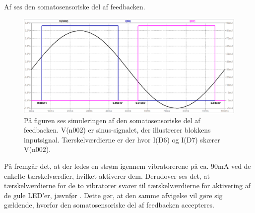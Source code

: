 \noindent Af  ses den somatosensoriske del af feedbacken.
\begin{figure}[H]
	\centering
	\includegraphics[scale=0.36]{figures/cProblemloesning/vibration_graf.PNG}
	\caption{På figuren ses simuleringen af den somatosensoriske del af feedbacken. V(n$002$) er sinus-signalet, der illustrerer blokkens inputsignal. Tærskelværdierne er der hvor I(D$6$) og I(D$7$) skærer V(n$002$).}
	\label{fig:vibration_graf}
\end{figure}
\noindent På  fremgår det, at der ledes en strøm igennem vibratorerene på ca. $90$mA ved de enkelte tærskelværdier, hvilket aktiverer dem. Derudover ses det, at tærskelværdierne for de to vibratorer svarer til tærskelværdierne for aktivering af de gule LED'er, jævnfør . Dette gør, at den samme afvigelse vil gøre sig gældende, hvorfor den somatosensoriske del af feedbacken accepteres. 

